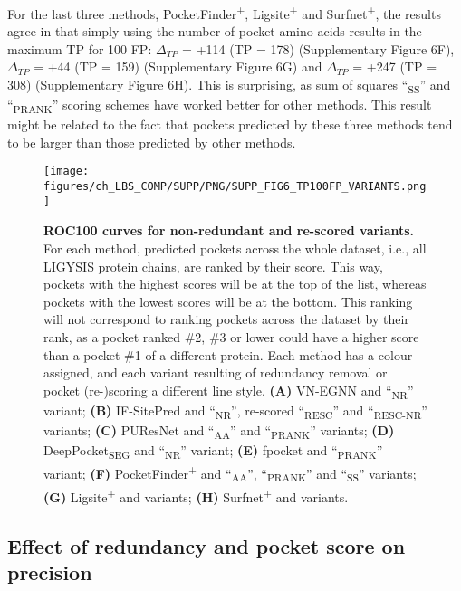 For the last three methods, PocketFinder\textsuperscript{+}, Ligsite\textsuperscript{+} and Surfnet\textsuperscript{+}, the results agree in that simply using the number of pocket amino acids results in the maximum TP for 100 FP: $\Delta_{TP}$ = +114 (TP = 178) (Supplementary Figure 6F), $\Delta_{TP}$ = +44 (TP = 159) (Supplementary Figure 6G) and $\Delta_{TP}$ = +247 (TP = 308) (Supplementary Figure 6H). This is surprising, as sum of squares ``\textsubscript{SS}'' and ``\textsubscript{PRANK}'' scoring schemes have worked better for other methods. This result might be related to the fact that pockets predicted by these three methods tend to be larger than those predicted by other methods.

\begin{figure}[ht!]
    \centering
    \texttt{[image: figures/ch\_LBS\_COMP/SUPP/PNG/SUPP\_FIG6\_TP100FP\_VARIANTS.png]}
    \caption[ROC100 curves for non-redundant and re-scored variants]{\textbf{ROC100 curves for non-redundant and re-scored variants.} For each method, predicted pockets across the whole dataset, i.e., all LIGYSIS protein chains, are ranked by their score. This way, pockets with the highest scores will be at the top of the list, whereas pockets with the lowest scores will be at the bottom. This ranking will not correspond to ranking pockets across the dataset by their rank, as a pocket ranked \#2, \#3 or lower could have a higher score than a pocket \#1 of a different protein. Each method has a colour assigned, and each variant resulting of redundancy removal or pocket (re-)scoring a different line style. \textbf{(A)} VN-EGNN and ``\textsubscript{NR}'' variant; \textbf{(B)} IF-SitePred and ``\textsubscript{NR}'', re-scored ``\textsubscript{RESC}'' and ``\textsubscript{RESC-NR}'' variants; \textbf{(C)} PUResNet and ``\textsubscript{AA}'' and ``\textsubscript{PRANK}'' variants; \textbf{(D)} DeepPocket\textsubscript{SEG} and ``\textsubscript{NR}'' variant; \textbf{(E)} fpocket and ``\textsubscript{PRANK}'' variant; \textbf{(F)} PocketFinder\textsuperscript{+} and ``\textsubscript{AA}'', ``\textsubscript{PRANK}'' and ``\textsubscript{SS}'' variants; \textbf{(G)} Ligsite\textsuperscript{+} and variants; \textbf{(H)} Surfnet\textsuperscript{+} and variants.}
    \label{fig:pocket_ROC100_variants}
\end{figure}

\FloatBarrier

\subsection{Effect of redundancy and pocket score on precision}

